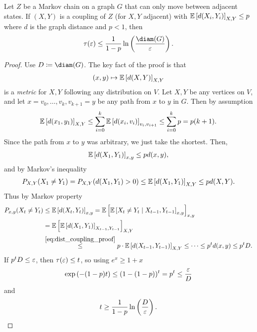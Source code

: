 \begin{theorem}
    Let $Z$ be a Markov chain on a graph $G$ that can only move between adjacent states.
    If $(X,Y)$ is a coupling of $Z$ (for $X,Y$ adjacent) with $\mathbb{E}\left[d(X_i,Y_i)\right]_{X,Y} \leq p$
    where $d$ is the graph distance and $p < 1$, then
    \begin{align*}
        \tau(\eps) \leq \frac{1}{1-p} \ln\left(\frac{\diam(G)}{\eps}\right).
    \end{align*}
\end{theorem}
\begin{proof}
    Use $D \coloneqq \diam(G)$.
    The key fact of the proof is that
    \begin{align}
        (x,y) \mapsto \mathbb{E}\left[d(X,Y)\right]_{X,Y}
    \end{align}
    is a \emph{metric} for $X,Y$ following any distribution on $V$.
    Let $X,Y$ be any vertices on $V$, and let $x = v_0, \dots, v_k, v_{k+1}=y$
    be any path from $x$ to $y$ in $G$.
    Then by assumption
    \begin{align*}
        \mathbb{E}\left[d(x_1,y_1)\right]_{X,Y} \leq \sum_{i=0}^{k} \mathbb{E}\left[d(x_i,v_i)\right]_{v_i,v_{i+1}} \leq \sum_{i=0}^{k} p = p (k+1).
    \end{align*}
    Since the path from $x$ to $y$ was arbitrary, we just take the shortest.
    Then,
    \begin{align}\label{eq:dist_coupling_proof}
        \mathbb{E}\left[d(X_1,Y_1)\right]_{x,y} \leq p d(x,y),
    \end{align}
    and by Markov's inequality
    \begin{align*}
        P_{X,Y}(X_1 \neq Y_1) = P_{X,Y}(d(X_1,Y_1) > 0) \leq \mathbb{E}\left[d(X_1,Y_1)\right]_{X,Y} \leq p d(X,Y).
    \end{align*}
    Thus by Markov property
    \begin{align*}
        P_{x,y}(X_t \neq Y_t) & \leq \mathbb{E}\left[d(X_t,Y_t)\right]_{x,y}
        = \mathbb{E}\left[\mathbb{E}\left[X_t \neq Y_t \mid X_{t-1},Y_{t-1}\right]_{x,y}\right]_{x,y}                                                                                         \\
                              & = \mathbb{E}\left[\mathbb{E}\left[d(X_1, Y_1)\right]_{X_{t-1},Y_{t-1}}\right]_{X,Y}                                                                           \\
                              & \overset{\eqref{eq:dist_coupling_proof}}{\leq} p \cdot \mathbb{E}\left[d(X_{t-1}, Y_{t-1})\right]_{X,Y} \leq \cdots \leq p^t d(x,y) \leq p^t D.
    \end{align*}
    If $p^t D \leq \varepsilon$, then $\tau(\varepsilon) \leq t$, so using $e^x \geq 1+x$
    \begin{align*}
        \exp\left(-(1-p)t\right) \leq (1 - (1-p))^t = p^t \leq \frac{\varepsilon}{D}
    \end{align*}
    and
    \begin{align*}
        t \geq \frac{1}{1-p}\ln\left(\frac{D}{\varepsilon}\right).
    \end{align*}
\end{proof}
